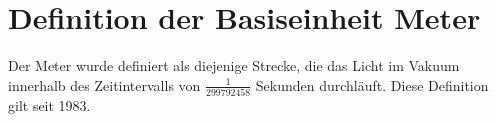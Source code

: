 \section{Definition der Basiseinheit Meter}
Der Meter wurde definiert als diejenige Strecke, die das Licht im Vakuum innerhalb des Zeitintervalls von $\frac{1}{299 792 458}$ Sekunden durchläuft.
Diese Definition gilt seit 1983. 